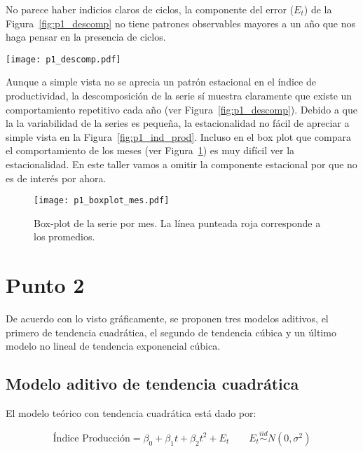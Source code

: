 \documentclass{tufte-handout}
\begin{document}
No parece haber indicios claros de ciclos, la componente del error ($E_t$) de la Figura~\ref{fig:p1_descomp} no tiene patrones observables mayores a un año que nos haga pensar en la presencia de ciclos.

\begin{figure*}[!ht]
    \texttt{[image: p1\_descomp.pdf]}
    \caption{Descomposición de la serie de tiempo en sus componentes; tendencia ($T_t$), estacional ($S_t$) y error ($E_t$)}
    \label{fig:p1_descomp}
\end{figure*}

Aunque a simple vista no se aprecia un patrón estacional en el índice de productividad, la descomposición de la serie sí muestra claramente que existe un comportamiento repetitivo cada año (ver Figura~\ref{fig:p1_descomp}). Debido a que la la variabilidad de la series es pequeña, la estacionalidad no fácil de apreciar a simple vista en la Figura~\ref{fig:p1_ind_prod}. Incluso en el box plot que compara el comportamiento de los meses (ver Figura~\ref{fig:p1_boxplot_mes}) es muy difícil ver la estacionalidad. En este taller vamos a omitir la componente estacional por que no es de interés por ahora.



\begin{figure}[!ht]
    \texttt{[image: p1\_boxplot\_mes.pdf]}
    \caption{Box-plot de la serie por mes. La línea punteada roja corresponde a los promedios.}
    \label{fig:p1_boxplot_mes}
\end{figure}


\pagebreak


\section*{Punto 2}

De acuerdo con lo visto gráficamente, se proponen tres modelos aditivos, el primero de tendencia cuadrática, el segundo de tendencia cúbica y un último modelo no lineal de tendencia exponencial cúbica.

\subsection*{Modelo aditivo de tendencia cuadrática}

El modelo teórico con tendencia cuadrática está dado por:

\begin{equation} \label{eq:mod1_comp}
	\text{Índice Producción} = \beta_0 + \beta_1 t + \beta_2 t^2 + E_t
	\qquad E_t \stackrel{iid}{\sim} N(0, \sigma^2)
\end{equation}
\end{document}

